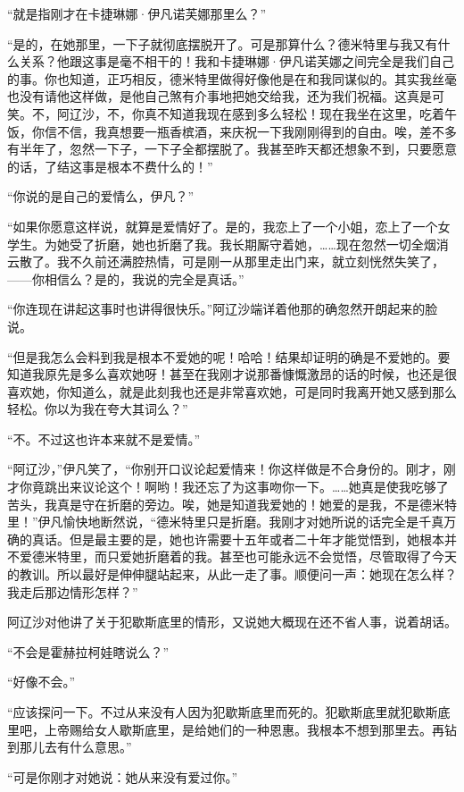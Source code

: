 \par “就是指刚才在卡捷琳娜·伊凡诺芙娜那里么？”
\par “是的，在她那里，一下子就彻底摆脱开了。可是那算什么？德米特里与我又有什么关系？他跟这事是毫不相干的！我和卡捷琳娜·伊凡诺芙娜之间完全是我们自己的事。你也知道，正巧相反，德米特里做得好像他是在和我同谋似的。其实我丝毫也没有请他这样做，是他自己煞有介事地把她交给我，还为我们祝福。这真是可笑。不，阿辽沙，不，你真不知道我现在感到多么轻松！现在我坐在这里，吃着午饭，你信不信，我真想要一瓶香槟酒，来庆祝一下我刚刚得到的自由。唉，差不多有半年了，忽然一下子，一下子全都摆脱了。我甚至昨天都还想象不到，只要愿意的话，了结这事是根本不费什么的！”
\par “你说的是自己的爱情么，伊凡？”
\par “如果你愿意这样说，就算是爱情好了。是的，我恋上了一个小姐，恋上了一个女学生。为她受了折磨，她也折磨了我。我长期厮守着她，……现在忽然一切全烟消云散了。我不久前还满腔热情，可是刚一从那里走出门来，就立刻恍然失笑了，——你相信么？是的，我说的完全是真话。”
\par “你连现在讲起这事时也讲得很快乐。”阿辽沙端详着他那的确忽然开朗起来的脸说。
\par “但是我怎么会料到我是根本不爱她的呢！哈哈！结果却证明的确是不爱她的。要知道我原先是多么喜欢她呀！甚至在我刚才说那番慷慨激昂的话的时候，也还是很喜欢她，你知道么，就是此刻我也还是非常喜欢她，可是同时我离开她又感到那么轻松。你以为我在夸大其词么？”
\par “不。不过这也许本来就不是爱情。”
\par “阿辽沙，”伊凡笑了，“你别开口议论起爱情来！你这样做是不合身份的。刚才，刚才你竟跳出来议论这个！啊哟！我还忘了为这事吻你一下。……她真是使我吃够了苦头，我真是守在折磨的旁边。唉，她是知道我爱她的！她爱的是我，不是德米特里！”伊凡愉快地断然说，“德米特里只是折磨。我刚才对她所说的话完全是千真万确的真话。但是最主要的是，她也许需要十五年或者二十年才能觉悟到，她根本并不爱德米特里，而只爱她折磨着的我。甚至也可能永远不会觉悟，尽管取得了今天的教训。所以最好是伸伸腿站起来，从此一走了事。顺便问一声：她现在怎么样？我走后那边情形怎样？”
\par 阿辽沙对他讲了关于犯歇斯底里的情形，又说她大概现在还不省人事，说着胡话。
\par “不会是霍赫拉柯娃瞎说么？”
\par “好像不会。”
\par “应该探问一下。不过从来没有人因为犯歇斯底里而死的。犯歇斯底里就犯歇斯底里吧，上帝赐给女人歇斯底里，是给她们的一种恩惠。我根本不想到那里去。再钻到那儿去有什么意思。”
\par “可是你刚才对她说：她从来没有爱过你。”
